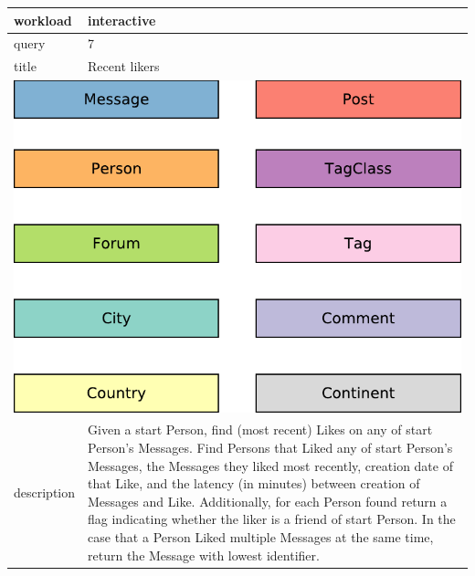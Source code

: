 \renewcommand*{\arraystretch}{1.1}

\noindent\begin{tabularx}{17cm}{|p{1.95cm}|X|}
	\hline
	workload    & interactive \\ \hline
%
	query       & 7 \\ \hline
%
	title       & Recent likers \\ \hline
	\multicolumn{2}{|c|}{ \includegraphics[scale=\patternscale,margin=0cm .2cm]{patterns/interactive07}} \\ \hline
	description & Given a start Person, find (most recent) Likes on any of start Person's
Messages. Find Persons that Liked any of start Person's Messages, the
Messages they liked most recently, creation date of that Like, and the
latency (in minutes) between creation of Messages and Like.
Additionally, for each Person found return a flag indicating whether the
liker is a friend of start Person. In the case that a Person Liked
multiple Messages at the same time, return the Message with lowest
identifier.
 \\ \hline
	

\end{tabularx}
